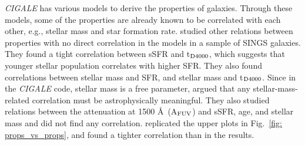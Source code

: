         {\em CIGALE} has various models to derive the properties of galaxies.
        Through these models, some of the properties are already known to be correlated with each other, e.g., stellar mass and star formation rate.
         studied other relations between properties with no direct correlation in the models in a sample of SINGS galaxies.
        They found a tight correlation between sSFR and t$_{\rm {D4000}}$, which suggests that younger stellar population correlates with higher SFR.
        They also found correlations between stellar mass and SFR, and stellar mass and t$_{\rm {D4000}}$.
        Since in the {\em CIGALE} code, stellar mass is a free parameter,  argued that any stellar-mass-related correlation must be astrophysically meaningful. 
        They also studied relations between the attenuation at 1500 \AA~(A$_{\rm {FUV}}$) and sSFR, age, and stellar mass and did not find any correlation.
         replicated the upper plots in Fig.~\ref{fig: props_vs_props}, and found a tighter correlation than in the  results. 
        
